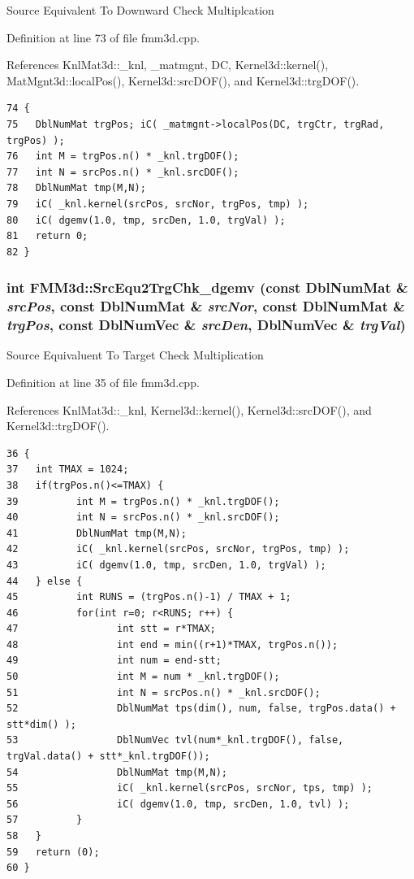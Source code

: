 Source Equivalent To Downward Check Multiplcation 

Definition at line 73 of file fmm3d.cpp.

References Knl\-Mat3d::\_\-knl, \_\-matmgnt, DC, Kernel3d::kernel(), Mat\-Mgnt3d::local\-Pos(), Kernel3d::src\-DOF(), and Kernel3d::trg\-DOF().

\footnotesize\begin{verbatim}74 {
75   DblNumMat trgPos; iC( _matmgnt->localPos(DC, trgCtr, trgRad, trgPos) );
76   int M = trgPos.n() * _knl.trgDOF();
77   int N = srcPos.n() * _knl.srcDOF();
78   DblNumMat tmp(M,N);
79   iC( _knl.kernel(srcPos, srcNor, trgPos, tmp) );
80   iC( dgemv(1.0, tmp, srcDen, 1.0, trgVal) );
81   return 0;
82 }
\end{verbatim}\normalsize 


\subsubsection{\setlength{\rightskip}{0pt plus 5cm}int FMM3d::Src\-Equ2Trg\-Chk\_\-dgemv (const Dbl\-Num\-Mat \& {\em src\-Pos}, const Dbl\-Num\-Mat \& {\em src\-Nor}, const Dbl\-Num\-Mat \& {\em trg\-Pos}, const Dbl\-Num\-Vec \& {\em src\-Den}, Dbl\-Num\-Vec \& {\em trg\-Val})\hspace{0.3cm}{\tt  [protected]}}\label{classFMM3d_3adc5bf96a97b455df85c08140bdae16_3adc5bf96a97b455df85c08140bdae16}


Source Equivaluent To Target Check Multiplication 

Definition at line 35 of file fmm3d.cpp.

References Knl\-Mat3d::\_\-knl, Kernel3d::kernel(), Kernel3d::src\-DOF(), and Kernel3d::trg\-DOF().

\footnotesize\begin{verbatim}36 {
37   int TMAX = 1024;
38   if(trgPos.n()<=TMAX) {
39          int M = trgPos.n() * _knl.trgDOF();
40          int N = srcPos.n() * _knl.srcDOF();
41          DblNumMat tmp(M,N);
42          iC( _knl.kernel(srcPos, srcNor, trgPos, tmp) );
43          iC( dgemv(1.0, tmp, srcDen, 1.0, trgVal) );
44   } else {
45          int RUNS = (trgPos.n()-1) / TMAX + 1;
46          for(int r=0; r<RUNS; r++) {
47                 int stt = r*TMAX;
48                 int end = min((r+1)*TMAX, trgPos.n());
49                 int num = end-stt;
50                 int M = num * _knl.trgDOF();
51                 int N = srcPos.n() * _knl.srcDOF();
52                 DblNumMat tps(dim(), num, false, trgPos.data() + stt*dim() );
53                 DblNumVec tvl(num*_knl.trgDOF(), false, trgVal.data() + stt*_knl.trgDOF());
54                 DblNumMat tmp(M,N);
55                 iC( _knl.kernel(srcPos, srcNor, tps, tmp) );
56                 iC( dgemv(1.0, tmp, srcDen, 1.0, tvl) );
57          }
58   }
59   return (0);
60 }
\end{verbatim}\normalsize 


